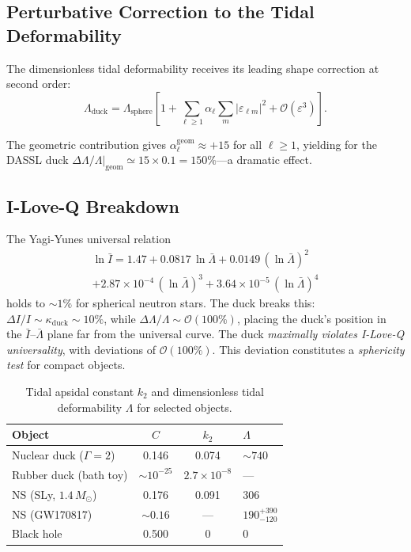 \documentclass[aps,prd,twocolumn,superscriptaddress,nofootinbib]{revtex4-2}
\newcommand{\Msun}{M_\odot}
\newcommand{\order}[1]{\mathcal{O}(#1)}
\begin{document}
\subsection{Perturbative Correction to the Tidal Deformability}
\label{sec:lambda_correction}

The dimensionless tidal deformability receives its leading shape correction
at second order:
\begin{equation}
\Lambda_{\mathrm{duck}} = \Lambda_{\mathrm{sphere}}\left[
  1 + \sum_{\ell \geq 1} \alpha_\ell \sum_m |\varepsilon_{\ell m}|^2
  + \order{\varepsilon^3}
\right].
\label{eq:Lambda_correction}
\end{equation}

The geometric contribution gives $\alpha_\ell^{\mathrm{geom}} \approx +15$
for all $\ell \geq 1$, yielding for the DASSL duck
$\Delta\Lambda/\Lambda|_{\mathrm{geom}} \simeq 15 \times 0.1 = 150\%$---a
dramatic effect.


\subsection{I-Love-Q Breakdown}
\label{sec:iloveq}

The Yagi-Yunes universal relation~\cite{YagiYunes2013a, YagiYunes2013b}
\begin{multline}
\ln \bar{I} = 1.47 + 0.0817\,\ln\bar{\Lambda}
  + 0.0149\,(\ln\bar{\Lambda})^2 \\
  + 2.87\times 10^{-4}\,(\ln\bar{\Lambda})^3
  + 3.64\times 10^{-5}\,(\ln\bar{\Lambda})^4
\label{eq:iloveq}
\end{multline}
holds to $\sim 1\%$ for spherical neutron stars.
The duck breaks this: $\Delta I/I \sim \kappa_{\mathrm{duck}} \sim 10\%$,
while $\Delta\Lambda/\Lambda \sim \order{100\%}$, placing the duck's
position in the $\bar{I}$--$\bar{\Lambda}$ plane far from the universal
curve.
The duck \textit{maximally violates I-Love-Q universality}, with deviations
of $\order{100\%}$.
This deviation constitutes a \textit{sphericity test} for compact objects.

\begin{table}[!htb]
\caption{Tidal apsidal constant $k_2$ and dimensionless tidal deformability
$\Lambda$ for selected objects.}
\label{tab:love_comparison}
\begin{ruledtabular}
\begin{tabular}{lccl}
Object & $C$ & $k_2$ & $\Lambda$ \\
\hline
Nuclear duck ($\Gamma\!=\!2$) & 0.146 & 0.074 & $\sim 740$ \\
Rubber duck (bath toy) & $\sim 10^{-25}$ & $2.7\!\times\!10^{-8}$ & --- \\
NS (SLy, $1.4\,\Msun$) & 0.176 & 0.091 & 306 \\
NS (GW170817) & $\sim 0.16$ & --- & $190^{+390}_{-120}$ \\
Black hole & 0.500 & 0 & 0 \\
\end{tabular}
\end{ruledtabular}
\end{table}
\end{document}
